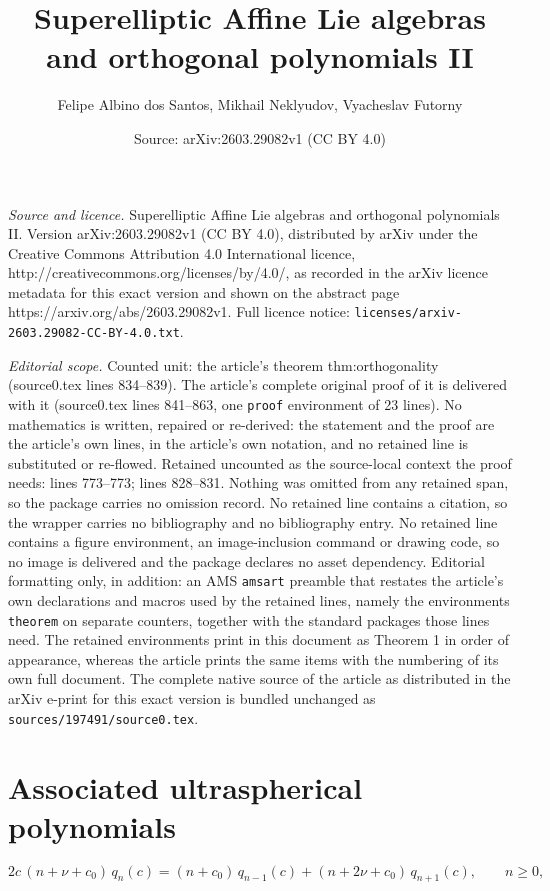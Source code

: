 \documentclass[10pt,a4paper]{amsart}
\title{Superelliptic Affine Lie algebras and orthogonal polynomials II}
\author{Felipe Albino dos Santos, Mikhail Neklyudov, Vyacheslav Futorny}
\date{Source: arXiv:2603.29082v1 (CC BY 4.0)}
\begin{document}
\maketitle

\noindent\emph{Source and licence.} Superelliptic Affine Lie algebras and orthogonal polynomials II. Version arXiv:2603.29082v1 (CC BY 4.0), distributed by arXiv under the Creative Commons Attribution 4.0 International licence, http://creativecommons.org/licenses/by/4.0/, as recorded in the arXiv licence metadata for this exact version and shown on the abstract page https://arxiv.org/abs/2603.29082v1. Full licence notice: \texttt{licenses/arxiv-2603.29082-CC-BY-4.0.txt}.\par\smallskip

\noindent\textit{Editorial scope.} Counted unit: the article's theorem thm:orthogonality (source0.tex lines 834--839). The article's complete original proof of it is delivered with it (source0.tex lines 841--863, one \texttt{proof} environment of 23 lines). No mathematics is written, repaired or re-derived: the statement and the proof are the article's own lines, in the article's own notation, and no retained line is substituted or re-flowed.  Retained uncounted as the source-local context the proof needs: lines 773--773; lines 828--831.  Nothing was omitted from any retained span, so the package carries no omission record.  No retained line contains a citation, so the wrapper carries no bibliography and no bibliography entry.  No retained line contains a figure environment, an image-inclusion command or drawing code, so no image is delivered and the package declares no asset dependency.  Editorial formatting only, in addition: an AMS \texttt{amsart} preamble that restates the article's own declarations and macros used by the retained lines, namely the environments \texttt{theorem} on separate counters, together with the standard packages those lines need.  The retained environments print in this document as Theorem 1 in order of appearance, whereas the article prints the same items with the numbering of its own full document.  The complete native source of the article as distributed in the arXiv e-print for this exact version is bundled unchanged as \texttt{sources/197491/source0.tex}.
\section{Associated ultraspherical polynomials}\label{subsec:assoc-ultra}

\begin{equation}\label{eq:assoc-ultra-rec-orth}
2c\,(n+\nu+c_0)\,q_n(c)=(n+c_0)\,q_{n-1}(c)+(n+2\nu+c_0)\,q_{n+1}(c),
\qquad n\ge0,
\end{equation}
\end{document}
